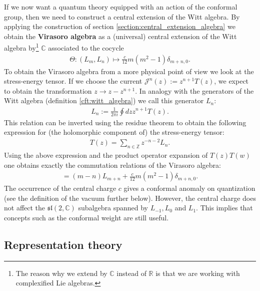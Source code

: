     If we now want a quantum theory equipped with an action of the conformal group, then we need to construct a central extension of the Witt algebra. By applying the construction of section \ref{section:central_extension_algebra} we obtain the \textbf{Virasoro algebra} as a (universal) central extension of the Witt algebra by\footnote{The reason why we extend by $\mathbb{C}$ instead of $\mathbb{R}$ is that we are working with complexified Lie algebras.} $\mathbb{C}$ associated to the cocycle
    \begin{gather}
        \Theta:(L_m, L_n)\mapsto\frac{c}{12}m(m^2-1)\delta_{m+n, 0}.
    \end{gather}
    To obtain the Virasoro algebra from a more physical point of view we look at the stress-energy tensor. If we choose the current $\mathcal{J}^n(z) := z^{n+1}T(z)$, we expect to obtain the transformation $z\longrightarrow z-z^{n+1}$. In analogy with the generators of the Witt algebra (definition \ref{cft:witt_algebra}) we call this generator $L_n$:
    \begin{gather}
        L_n := \frac{1}{2\pi i}\oint dzz^{n+1}T(z).
    \end{gather}
    This relation can be inverted using the residue theorem to obtain the following expression for (the holomorphic component of) the stress-energy tensor:
    \begin{gather}
        T(z) = \sum_{n\in\mathbb{Z}}z^{-n-2}L_n.
    \end{gather}
    Using the above expression and the product operator expansion of $T(z)T(w)$ one obtains exactly the commutation relations of the Virasoro algebra:
    \begin{gather}
        [L_m, L_n] = (m-n)L_{m+n} + \frac{c}{12}m(m^2-1)\delta_{m+n, 0}.
    \end{gather}
    The occurrence of the central charge $c$ gives a conformal anomaly on quantization (see the definition of the vacuum further below). However, the central charge does not affect the $\mathfrak{sl}(2, \mathbb{C})$ subalgebra spanned by $L_{-1}, L_0$ and $L_1$. This implies that concepts such as the conformal weight are still useful.

\subsection{Representation theory}


